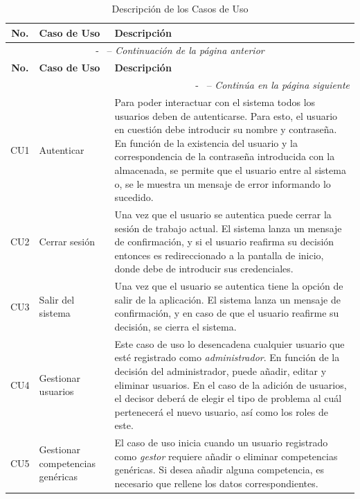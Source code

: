 \begin{longtable}{| c | p{3cm} | p{9cm} |}
	\caption{Descripción de los Casos de Uso}\label{desc-cu}\\
	\toprule[1.7pt]
	\textbf{No.} & \textbf{Caso de Uso} & \textbf{Descripción}\\ \hline
	\endfirsthead
	\multicolumn{3}{c}{\tablename - \thetable\ -- \textit{Continuación de la página anterior} }\\ \toprule[1.2pt]
	\textbf{No.} & \textbf{Caso de Uso} & \textbf{Descripción}\\ \hline
	\endhead
	\multicolumn{3}{r}{\tablename - \thetable\ -- \textit{Continúa en la página siguiente} }\\
	\endfoot
	\endlastfoot
	
	
	CU1&Autenticar & Para poder interactuar con el sistema todos los usuarios deben de autenticarse. Para esto, el usuario en cuestión debe introducir su nombre y contraseña. En función de la existencia del usuario y la correspondencia de la contraseña introducida con la almacenada, se permite que el usuario entre al sistema o, se le muestra un mensaje de error informando lo sucedido.\\ \hline
	
	CU2&Cerrar sesión & Una vez que el usuario se autentica puede cerrar la sesión de trabajo actual. El sistema lanza un mensaje de confirmación, y si el usuario reafirma su decisión entonces es redireccionado a la pantalla de inicio, donde debe de introducir sus credenciales.\\ \hline
	
	CU3&Salir del sistema & Una vez que el usuario se autentica tiene la opción de salir de la aplicación. El sistema lanza un mensaje de confirmación, y en caso de que el usuario reafirme su decisión, se cierra el sistema.\\ \hline
	
	CU4&Gestionar usuarios & Este caso de uso lo desencadena cualquier usuario que esté registrado como \textit{administrador}. En función de la decisión del administrador, puede añadir, editar y eliminar usuarios. En el caso de la adición de usuarios, el decisor deberá de elegir el tipo de problema al cuál pertenecerá el nuevo usuario, así como los roles de este.\\ \hline
	
	CU5&Gestionar competencias genéricas & El caso de uso inicia cuando un usuario registrado como \textit{gestor} requiere añadir o eliminar competencias genéricas. Si desea añadir alguna competencia, es necesario que rellene los datos correspondientes.\\ \hline
	

\end{longtable}
